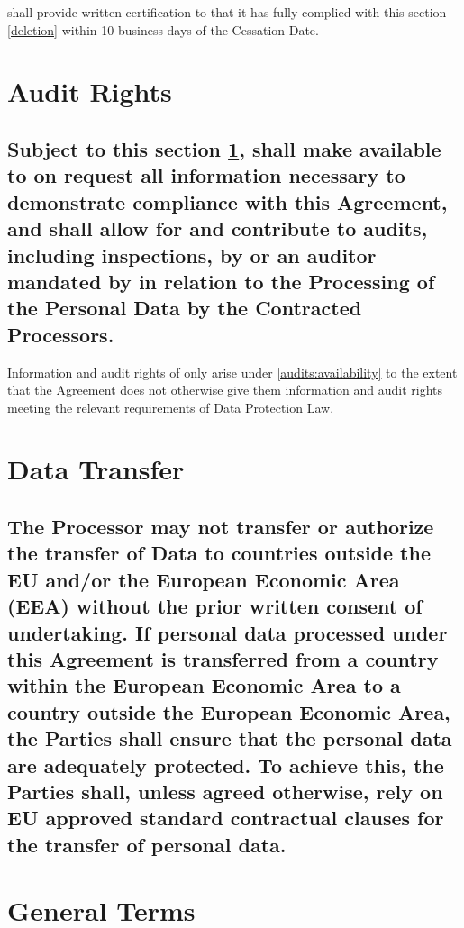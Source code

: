 \documentclass[a4paper]{article}
\begin{document}
 shall provide written certification to  that it has fully complied with this section \ref{deletion} within 10 business days of the Cessation Date.

\section{Audit Rights}
\label{audits}

\subsection{Subject to this section \ref{audits},  shall make available to  on request all information necessary to demonstrate compliance with this Agreement, and shall allow for and contribute to audits, including inspections, by  or an auditor mandated by  in relation to the Processing of the  Personal Data by the Contracted Processors.}
\label{audits:availability}

Information and audit rights of  only arise under \autoref{audits:availability} to the extent that the Agreement does not otherwise give them information and audit rights meeting the relevant requirements of Data Protection Law.

\section{Data Transfer}

\subsection{The Processor may not transfer or authorize the transfer of Data to countries outside the EU and/or the European Economic Area (EEA) without the prior written consent of \gls{undertaking}.
If personal data processed under this Agreement is transferred from a country within the European Economic Area to a country outside the European Economic Area, the Parties shall ensure that the personal data are adequately protected.
To achieve this, the Parties shall, unless agreed otherwise, rely on EU approved standard contractual clauses for the transfer of personal data.}

\section{General Terms}
\end{document}
